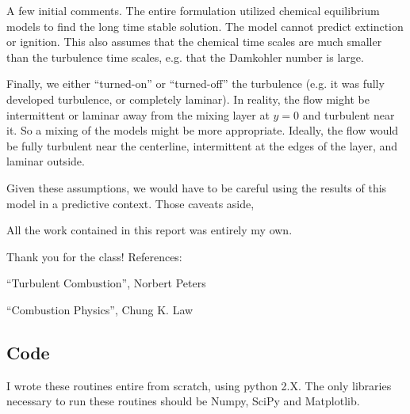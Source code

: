 \documentclass{article}
\begin{document}
A few initial comments. The entire formulation utilized chemical
equilibrium models to find the long time stable solution. The model
cannot predict extinction or ignition. This also assumes that the
chemical time scales are much smaller than the turbulence time scales,
e.g. that the Damkohler number is large.  

Finally, we either ``turned-on'' or ``turned-off'' the turbulence
(e.g. it was fully developed turbulence, or completely laminar). In
reality, the flow might be intermittent or laminar away from the mixing
layer at $y=0$ and turbulent near it. So a mixing of the models might be
more appropriate. Ideally, the flow would be fully turbulent near the
centerline, intermittent at the edges of the layer, and laminar outside. 

Given these assumptions, we would have to be careful using the results
of this model in a predictive context. Those caveats aside, 


\newpage
All the work contained in this report was entirely my own. 

Thank you for the class! 
\vspace{1in}
\newline
References:

``Turbulent Combustion'', Norbert Peters

``Combustion Physics'', Chung K. Law


\subsection*{Code}
I wrote these routines entire from scratch, using python 2.X. The only
libraries necessary to run these routines should be Numpy, SciPy and
Matplotlib.  

\end{document}
